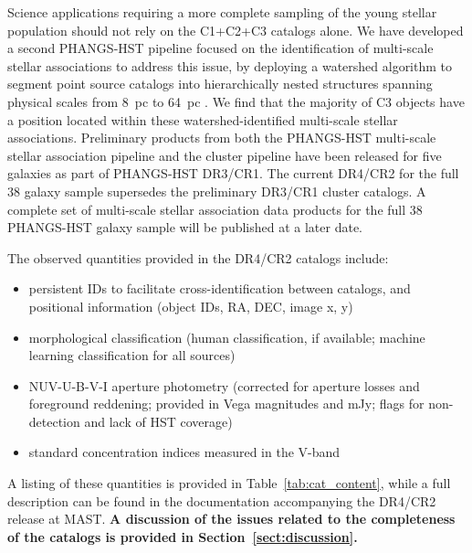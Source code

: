 \documentclass[linenumbers]{aastex63}
\begin{document}
Science applications requiring a more complete sampling of the young stellar population should not rely on the C1+C2+C3 catalogs alone.  We have developed a second PHANGS-HST pipeline focused on the identification of multi-scale stellar associations to address this issue, by deploying a watershed algorithm to segment point source catalogs into hierarchically nested structures spanning physical scales from 8~pc to 64~pc \citep{larson_multiscale_2023}.  We find that the majority of C3 objects have a position located within these watershed-identified multi-scale stellar associations. Preliminary products from both the PHANGS-HST multi-scale stellar association pipeline and the cluster pipeline have been released for five galaxies as part of PHANGS-HST DR3/CR1.  The current DR4/CR2 for the full 38 galaxy sample supersedes the preliminary DR3/CR1 cluster catalogs.  A complete set of multi-scale stellar association data products for the full 38 PHANGS-HST galaxy sample will be published at a later date. %

The observed quantities provided in the DR4/CR2 catalogs include:
\begin{itemize}
\item persistent IDs to facilitate cross-identification between catalogs, and positional information (object IDs, RA, DEC, image x, y)
\item morphological classification (human classification, if available; machine learning classification for all sources)
\item NUV-U-B-V-I aperture photometry (corrected for aperture losses and foreground reddening; provided in Vega magnitudes and mJy; flags for non-detection and lack of HST coverage)
\item standard concentration indices measured in the V-band
\end{itemize}

A listing of these quantities is provided in Table~\ref{tab:cat_content}, while a full description can be found in the documentation accompanying the DR4/CR2 release at MAST. \textbf{A discussion of the issues related to the completeness of the catalogs is provided in Section~\ref{sect:discussion}.}


%

%


\end{document}
